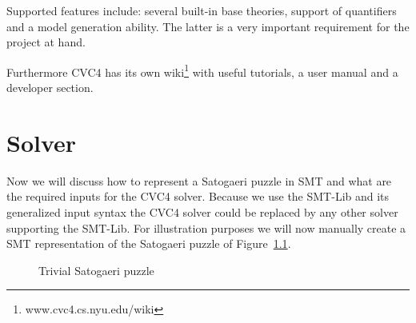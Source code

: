 Supported features include: several built-in base theories, support of quantifiers and a model generation ability. The latter is a very important requirement for the project at hand.

Furthermore CVC4 has its own wiki\footnote{www.cvc4.cs.nyu.edu/wiki} with useful tutorials, a user manual and a developer section.

\chapter{Solver} \label{The Solver}
Now we will discuss how to represent a Satogaeri puzzle in SMT and what are the required inputs for the CVC4 solver. Because we use the SMT-Lib and its generalized input syntax the CVC4 solver could be replaced by any other solver supporting the SMT-Lib. For illustration purposes we will now manually create a SMT representation of the Satogaeri puzzle of Figure~\ref{fig:solver_example}.
\begin{figure}
  \centering
  \caption{Trivial Satogaeri puzzle}
  \label{fig:solver_example}
\end{figure}

